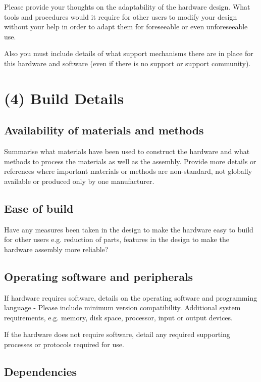 \documentclass[a4paper]{article}
\begin{document}
Please provide your thoughts on the adaptability of the hardware
design. What tools and procedures would it require for other users to
modify your design without your help in order to adapt them for
foreseeable or even unforeseeable use.

Also you must include details of what support mechanisms there are in
place for this hardware and software (even if there is no support or
support community).


\section{(4) Build Details}\label{h.l8i9vokvs0bj}

\subsection{Availability of materials and methods}\label{h.60suejv0jlzi}

Summarise what materials have been used to construct the hardware and
what methods to process the materials as well as the assembly. Provide
more details or references where important materials or methods are
non-standard, not globally available or produced only by one
manufacturer.


\subsection{Ease of build}\label{h.wg823sgyb1e4}

Have any measures been taken in the design to make the hardware easy to
build for other users e.g. reduction of parts, features in the design
to make the hardware assembly more reliable?


\subsection{Operating software and peripherals}\label{h.uz77dixfh5i4}

If hardware requires software, details on the operating software and
programming language - Please include minimum version compatibility.
Additional system requirements, e.g. memory, disk space, processor,
input or output devices.

If the hardware does not require software, detail any required
supporting processes or protocols required for use.


\subsection{Dependencies}\label{h.vr0vnjs8z9ar}
\end{document}
